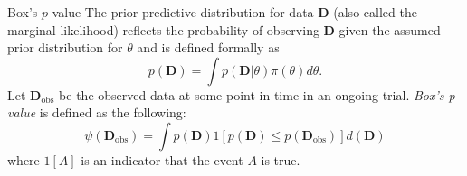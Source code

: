 \documentclass{beamer}
\begin{document}
\begin{frame}{Box's $p$-value}
The prior-predictive distribution for data $\mathbf{D}$ (also called the marginal likelihood) reflects the probability of observing $\mathbf{D}$ given 
the assumed prior distribution for $\theta$ and is defined formally as
\begin{equation}\label{eq:pred_dist}
p(\mathbf{D}) =\int p(\mathbf{D}|\theta)\pi(\theta)d\theta.
\end{equation}
Let $\mathbf{D}_{\text{obs}}$ be the observed data at some point in time in an ongoing trial. 
\textit{Box's p-value} is defined as the following:
\begin{equation}\label{eq:box_p}
\psi({\mathbf{D}_{\text{obs}}})=\int {p(\mathbf{D})}  1[p(\mathbf{D})\leq p(\mathbf{D}_{\text{obs}})] d(\mathbf{D})
\end{equation}
%
where $1[A]$ is an indicator that the event $A$ is true.
\end{frame}
\end{document}
